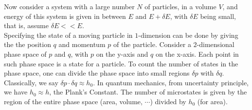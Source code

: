 \documentclass[11pt,oneside]{book}
\theoremstyle{break}
\theoremstyle{break}
\begin{document}
Now consider a system with a large number $N$ of particles, in a volume $V$, and energy of this system is given in between $E$ and $E+ \delta E$, with $\delta E$ being small, that is, assume $\delta E << E$. \\

Specifying the state of a moving particle in $1$-dimension can be done by giving the the position $q$ and momentum $p$ of the particle. Consider a $2$-dimensional phase space of $p$ and $q$, with $p$ on the y-axis and $q$ on the x-axis. Each point in such phase space is a state for a particle. To count the number of states in the phase space, one can divide the phase space into small regions $\delta p$ with $\delta q$. Classically, we say $\delta p \cdot \delta q \approx h_0$. In quantum mechanics, from uncertainty principle, we have $h_0 \approx h$, the Plank's Constant. The number of microstates is given by the region of the entire phase space (area, volume, $\cdots$) divided by $h_0$ (for area). \\
\end{document}
